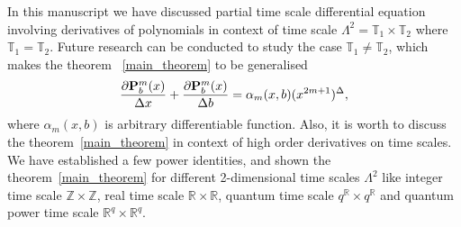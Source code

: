 In this manuscript we have discussed partial time scale differential equation involving derivatives of polynomials
in context of time scale $\Lambda^2 = \mathbb{T}_1 \times \mathbb{T}_2$ where $\mathbb{T}_1 = \mathbb{T}_2$.
Future research can be conducted to study the case $\mathbb{T}_1 \neq \mathbb{T}_2$,
which makes the theorem ~\ref{main_theorem} to be generalised
\[
    \frac{\partial {\mathbf{P}}\sp{m} \sb{b}(x)}{\Delta x} +
    \frac{\partial {\mathbf{P}}\sp{m} \sb{b}(x)}{\Delta b}
    = \alpha_m(x,b) (x^{2m+1})^{\Delta},
\]
where $\alpha_m(x,b)$ is arbitrary differentiable function.
Also, it is worth to discuss the theorem~\ref{main_theorem} in context of high order derivatives on time scales.
We have established a few power identities, and shown the theorem~\ref{main_theorem} for different 2-dimensional
time scales $\Lambda^2$ like integer time scale $\mathbb{Z} \times \mathbb{Z}$, real time scale $\mathbb{R} \times \mathbb{R}$,
quantum time scale $q^{\mathbb{R}} \times q^{\mathbb{R}}$ and quantum power time scale $\mathbb{R}^q \times \mathbb{R}^q$.
